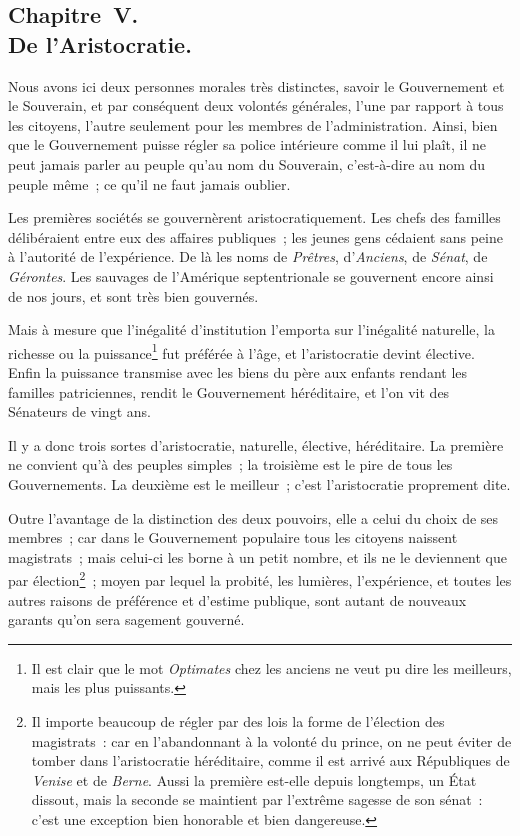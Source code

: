 \documentclass[french,twoside]{book} %
\begin{document}
\subsection[{Chapitre V. De l’Aristocratie.}]{Chapitre V. \\
De l’Aristocratie.}
\noindent Nous avons ici deux personnes morales très distinctes, savoir le Gouvernement et le Souverain, et par conséquent deux volontés générales, l’une par rapport à tous les citoyens, l’autre seulement pour les membres de l’administration. Ainsi, bien que le Gouvernement puisse régler sa police intérieure comme il lui plaît, il ne peut jamais parler au peuple qu’au nom du Souverain, c’est-à-dire au nom du peuple même ; ce qu’il ne faut jamais oublier.\par
Les premières sociétés se gouvernèrent aristocratiquement. Les chefs des familles délibéraient entre eux des affaires publiques ; les jeunes gens cédaient sans peine à l’autorité de l’expérience. De là les noms de {\itshape Prêtres}, d’{\itshape Anciens}, de {\itshape Sénat}, de {\itshape Gérontes}. Les sauvages de l’Amérique septentrionale se gouvernent encore ainsi de nos jours, et sont très bien gouvernés.\par
Mais à mesure que l’inégalité d’institution l’emporta sur l’inégalité naturelle, la richesse ou la puissance\footnote{Il est clair que le mot {\itshape Optimates} chez les anciens ne veut pu dire les meilleurs, mais les plus puissants.} fut préférée à l’âge, et l’aristocratie devint élective. Enfin la puissance transmise avec les biens du père aux enfants rendant les familles patriciennes, rendit le Gouvernement héréditaire, et l’on vit des Sénateurs de vingt ans.\par
Il y a donc trois sortes d’aristocratie, naturelle, élective, héréditaire. La première ne convient qu’à des peuples simples ; la troisième est le pire de tous les Gouvernements. La deuxième est le meilleur ; c’est l’aristocratie proprement dite.\par
Outre l’avantage de la distinction des deux pouvoirs, elle a celui du choix de ses membres ; car dans le Gouvernement populaire tous les citoyens naissent magistrats ; mais celui-ci les borne à un petit nombre, et ils ne le deviennent que par élection\footnote{Il importe beaucoup de régler par des lois la forme de l’élection des magistrats : car en l’abandonnant à la volonté du prince, on ne peut éviter de tomber dans l’aristocratie héréditaire, comme il est arrivé aux Républiques de {\itshape Venise} et de {\itshape Berne}. Aussi la première est-elle depuis longtemps, un État dissout, mais la seconde se maintient par l’extrême sagesse de son sénat : c’est une exception bien honorable et bien dangereuse.} ; moyen par lequel la probité, les lumières, l’expérience, et toutes les autres raisons de préférence et d’estime publique, sont autant de nouveaux garants qu’on sera sagement gouverné.\par
\end{document}
